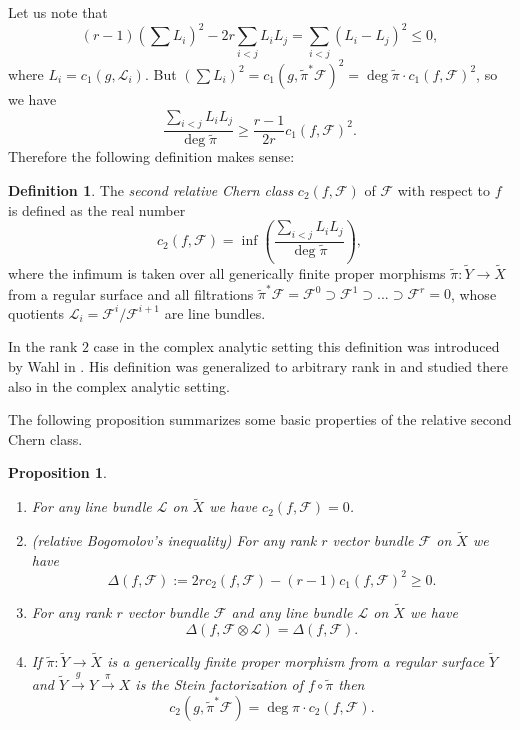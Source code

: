 \documentclass[twoside, 11pt]{article}
\theoremstyle{plain}
\newtheorem{Proposition}[Thm]{\sc Proposition}
\theoremstyle{definition}
\newtheorem{Definition}[Thm]{Definition}
\theoremstyle{remark}
\newcommand{\cF}{{\mathcal F}}
\newcommand{\cL}{{\mathcal L}}
\begin{document}
Let us note that
$$(r-1) (\sum L_i)^2-2r \sum _{i<j} L_iL_j=\sum _{i<j} (L_i-L_j)^2\le 0,$$
where $L_i=c_1(g, \cL_i)$.
But $ (\sum L_i)^2= c_1(g, \tilde \pi ^*\cF)^2=\deg \tilde \pi  \cdot  c_1(f, \cF)^2$, so we have
$$\frac{\sum _{i<j} L_iL_j}{\deg \tilde \pi}\ge \frac{r-1}{2r}c_1(f, \cF)^2.$$
Therefore the following definition makes sense:

\begin{Definition}\label{definition-c_2-surfaces}
The \emph{second relative Chern class} $c_2(f, \cF)$ of $\cF$ with respect to $f$  is defined as the real number
$$c_2(f, \cF)= \inf \left(\frac{\sum _{i<j} L_iL_j}{\deg \tilde \pi }\right),$$
where the infimum is taken over all  generically finite proper morphisms $\tilde \pi: \tilde Y\to \tilde X$  from a regular surface and all filtrations  $\tilde \pi ^*\cF=\cF ^0\supset \cF^1 \supset ...\supset \cF ^r=0$, whose 
quotients $\cL _i= \cF^i/{\cF^{i+1}}$ are line bundles. 
\end{Definition}

In the rank $2$ case in the complex analytic setting this definition was introduced by  Wahl  in \cite{Wa}. His definition was generalized to arbitrary rank in \cite{La0} and studied there also in the complex analytic setting. 

The following proposition summarizes some basic properties of the relative second Chern class.


\begin{Proposition}\label{basic-properties-c_2}
\begin{enumerate}
\item For any line bundle $\cL$ on $\tilde X$ we have $c_2(f, \cF)=0$.
\item (relative Bogomolov's inequality) For any rank $r$ vector bundle $\cF$ on $\tilde X$ we have
$$\Delta (f, \cF):= 2r c_2 (f, \cF)- (r-1)c_1 (f, \cF)^2\ge 0.$$
\item For any rank $r$ vector bundle $\cF$ and any line bundle $\cL$ on $\tilde X$ we have
$$ \Delta (f, \cF \otimes \cL)= \Delta (f, \cF ).$$
\item If  $\tilde \pi: \tilde Y\to \tilde X$ is a generically finite proper morphism from a regular surface $\tilde Y$
and  $\tilde Y\xrightarrow{g} Y\xrightarrow{\pi}X$ is the Stein factorization of $f\circ \tilde \pi$ then
$$c_2(g, \tilde \pi ^*\cF) = \deg \pi \cdot c_2(f, \cF).$$
\end{enumerate}
\end{Proposition}
\end{document}
